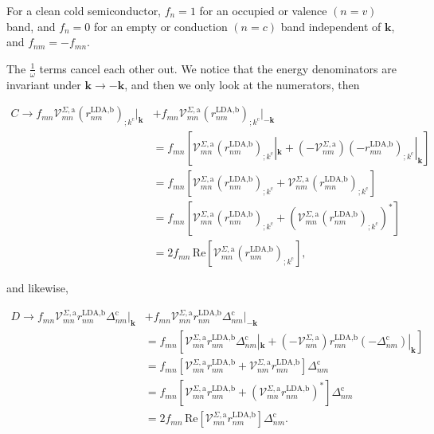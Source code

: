 \documentclass[10pt]{article}
\begin{document}
For a clean cold semiconductor, $f_{n} = 1$ for an occupied or valence $(n = v)$ band, and $f_{n} = 0$ for an empty or conduction $(n = c)$ band independent of $\mathbf{k}$, and $f_{nm}=-f_{mn}$.

The $\frac{1}{\omega}$ terms cancel each other out. We notice that the energy denominators are invariant under $\mathbf{k} \rightarrow - \mathbf{k}$, and then we only look at the numerators, then

\begin{align}\label{ct}
C \rightarrow f_{mn}\mathcal{V}^{\Sigma,\text{a}}_{mn}\left(r^{\text{LDA,b}}_{nm}\right)_{;k^{\text{c}}}|_{\mathbf{k}}
&+ f_{mn}\mathcal{V}^{\Sigma,\text{a}}_{mn}\left(r^{\text{LDA,b}}_{nm}\right)_{;k^{\text{c}}}|_{-\mathbf{k}}\nonumber\\
&= f_{mn}\left[\mathcal{V}^{\Sigma,\text{a}}_{mn}\left(r^{\text{LDA,b}}_{nm}\right)_{;k^{\text{c}}}|_{\mathbf{k}} + \left(-\mathcal{V}^{\Sigma,\text{a}}_{nm}\right)\left(-r^{\text{LDA,b}}_{mn}\right)_{;k^{\text{c}}}|_{\mathbf{k}}\right]\nonumber\\
&= f_{mn}\left[\mathcal{V}^{\Sigma,\text{a}}_{mn}\left(r^{\text{LDA,b}}_{nm}\right)_{;k^{\text{c}}} + \mathcal{V}^{\Sigma,\text{a}}_{nm}\left(r^{\text{LDA,b}}_{mn}\right)_{;k^{\text{c}}}\right]\nonumber\\
&= f_{mn}\left[\mathcal{V}^{\Sigma,\text{a}}_{mn}\left(r^{\text{LDA,b}}_{nm}\right)_{;k^{\text{c}}} + \left(\mathcal{V}^{\Sigma,\text{a}}_{mn}\left(r^{\text{LDA,b}}_{nm}\right)_{;k^{\text{c}}}\right)^*\right]\nonumber\\
&= 2f_{mn}\,\mathrm{Re}\left[\mathcal{V}^{\Sigma,\text{a}}_{mn}\left(r^{\text{LDA,b}}_{nm}\right)_{;k^{\text{c}}}\right],
\end{align}

and likewise,

\begin{align}\label{dt}
D \rightarrow f_{mn}\mathcal{V}^{\Sigma,\text{a}}_{mn}r^{\text{LDA,b}}_{nm}\Delta^{\text{c}}_{nm}|_{\mathbf{k}} 
&+ f_{mn}\mathcal{V}^{\Sigma,\text{a}}_{mn}r^{\text{LDA,b}}_{nm}\Delta^{\text{c}}_{nm}|_{-\mathbf{k}}\nonumber\\
&= f_{mn}\left[\mathcal{V}^{\Sigma,\text{a}}_{mn}r^{\text{LDA,b}}_{nm}\Delta^{\text{c}}_{nm}|_{\mathbf{k}} + \left(-\mathcal{V}^{\Sigma,\text{a}}_{nm}\right)r^{\text{LDA,b}}_{mn}\left(-\Delta^{\text{c}}_{nm}\right)|_{\mathbf{k}}\right]\nonumber\\
&= f_{mn}\left[\mathcal{V}^{\Sigma,\text{a}}_{mn}r^{\text{LDA,b}}_{nm} + \mathcal{V}^{\Sigma,\text{a}}_{nm}r^{\text{LDA,b}}_{mn}\right]\Delta^{\text{c}}_{nm}\nonumber\\
&= f_{mn}\left[\mathcal{V}^{\Sigma,\text{a}}_{mn}r^{\text{LDA,b}}_{nm} + \left(\mathcal{V}^{\Sigma,\text{a}}_{mn}r^{\text{LDA,b}}_{nm}\right)^*\right]\Delta^{\text{c}}_{nm}\nonumber\\
&= 2f_{mn}\,\mathrm{Re}\left[\mathcal{V}^{\Sigma,\text{a}}_{mn}r^{\text{LDA,b}}_{nm}\right]\Delta^{\text{c}}_{nm}.
\end{align}
\end{document}
